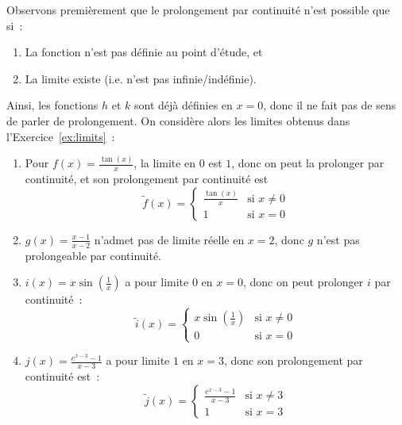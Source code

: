 \begin{exercice}
Observons premièrement que le prolongement par continuité n'est possible que si~:
\begin{enumerate}
    \item La fonction n'est pas définie au point d'étude, et
    \item La limite existe (i.e. n'est pas infinie/indéfinie).
\end{enumerate}
Ainsi, les fonctions $h$ et $k$ sont déjà définies en $x = 0$, donc il ne fait pas de sens de parler de prolongement. On considère alors les limites obtenus dans l'Exercice~\ref{ex:limits}~:
\begin{enumerate}
    \item Pour $f(x) = \frac{\tan(x)}{x}$, la limite en $0$ est $1$, donc on peut la prolonger par continuité, et son prolongement par continuité est
    \[
    \tilde{f}(x) = \begin{cases}
    \frac{\tan(x)}{x} & \textrm{si } x \neq 0 \\
    1 & \textrm{si } x = 0
    \end{cases}
    \]
    \item $g(x) = \frac{x-1}{x-2}$ n'admet pas de limite réelle en $x = 2$, donc $g$ n'est pas prolongeable par continuité.
    \item $i(x) = x \sin\left(\frac{1}{x}\right)$ a pour limite $0$ en $x = 0$, donc on peut prolonger $i$ par continuité~:
    \[
    \tilde{i}(x) = \begin{cases}
    x \sin\left(\frac{1}{x}\right) & \textrm{si } x \neq 0 \\
    0 & \textrm{si } x = 0
    \end{cases}
    \]
    \item $j(x) = \frac{e^{x-3} - 1}{x-3}$ a pour limite $1$ en $x = 3$, donc son prolongement par continuité est~:
    \[
    \tilde{j}(x) = \begin{cases}
    \frac{e^{x-3} - 1}{x-3} & \textrm{si } x \neq 3 \\
    1 & \textrm{si } x = 3
    \end{cases}
    \]
\end{enumerate}
\end{exercice}

